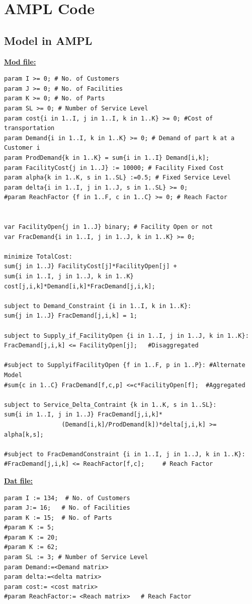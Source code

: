 \documentclass[12pt]{article}
\numberwithin{equation}{section}
\begin{document}
\section{AMPL Code}
\label{code}
\subsection{Model in AMPL}
\textbf{\underline {Mod file:}}\\
\begin{verbatim}
param I >= 0; # No. of Customers
param J >= 0; # No. of Facilities
param K >= 0; # No. of Parts
param SL >= 0; # Number of Service Level
param cost{i in 1..I, j in 1..I, k in 1..K} >= 0; #Cost of transportation
param Demand{i in 1..I, k in 1..K} >= 0; # Demand of part k at a Customer i
param ProdDemand{k in 1..K} = sum{i in 1..I} Demand[i,k];
param FacilityCost{j in 1..J} := 10000; # Facility Fixed Cost
param alpha{k in 1..K, s in 1..SL} :=0.5; # Fixed Service Level
param delta{i in 1..I, j in 1..J, s in 1..SL} >= 0; 
#param ReachFactor {f in 1..F, c in 1..C} >= 0; # Reach Factor 
                                                        

var FacilityOpen{j in 1..J} binary; # Facility Open or not
var FracDemand{i in 1..I, j in 1..J, k in 1..K} >= 0;

minimize TotalCost:
sum{j in 1..J} FacilityCost[j]*FacilityOpen[j] + 
sum{i in 1..I, j in 1..J, k in 1..K} cost[j,i,k]*Demand[i,k]*FracDemand[j,i,k];

subject to Demand_Constraint {i in 1..I, k in 1..K}:
sum{j in 1..J} FracDemand[j,i,k] = 1;

subject to Supply_if_FacilityOpen {i in 1..I, j in 1..J, k in 1..K}:
FracDemand[j,i,k] <= FacilityOpen[j];   #Disaggregated

#subject to SupplyifFacilityOpen {f in 1..F, p in 1..P}: #Alternate Model
#sum{c in 1..C} FracDemand[f,c,p] <=c*FacilityOpen[f];  #Aggregated 

subject to Service_Delta_Contraint {k in 1..K, s in 1..SL}:
sum{i in 1..I, j in 1..J} FracDemand[j,i,k]*
                (Demand[i,k]/ProdDemand[k])*delta[j,i,k] >= alpha[k,s];

#subject to FracDemandConstraint {i in 1..I, j in 1..J, k in 1..K}:
#FracDemand[j,i,k] <= ReachFactor[f,c];     # Reach Factor 
\end{verbatim}
\textbf{\underline{Dat file:}}
\begin{verbatim}
param I := 134;  # No. of Customers
param J:= 16;   # No. of Facilities
param K := 15;  # No. of Parts
#param K := 5;
#param K := 20;
#param K := 62;
param SL := 3; # Number of Service Level
param Demand:=<Demand matrix>
param delta:=<delta matrix>
param cost:= <cost matrix>
#param ReachFactor:= <Reach matrix>   # Reach Factor

\end{verbatim}
\end{document}
